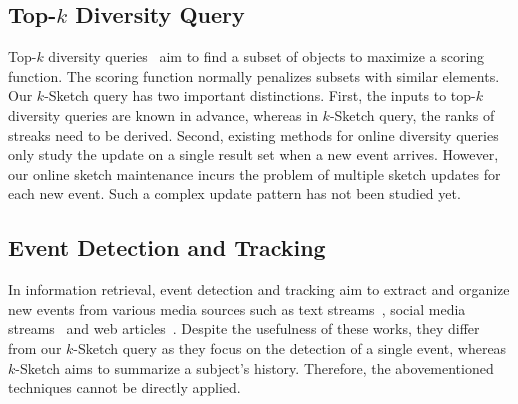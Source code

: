 \subsection{Top-$k$ Diversity Query}
Top-$k$ diversity queries~\cite{agrawal2009diversifying,borodin2012max,drosou2014diverse,chen2015diversity}
aim to find a subset of objects to maximize a scoring function. The scoring function normally penalizes
subsets with similar elements. Our 
$k$-Sketch query has two important distinctions.
First, the inputs to top-$k$ diversity queries are known in advance, whereas in $k$-Sketch query, the ranks of streaks need to be derived. 
Second, existing methods for online diversity queries~\cite{borodin2012max,drosou2014diverse,chen2015diversity} only study
the update on a single result set when a new event arrives. However, our online sketch maintenance 
incurs the problem of multiple sketch updates for each new event. Such a complex update pattern has not been studied yet.

\subsection{Event Detection and Tracking}
In information retrieval, event detection and tracking aim to extract and organize new events from various
media sources such as text streams~\cite{allan1998line,brants2003asystem}, social media streams~\cite{li2015social} and web articles~\cite{Vuurens2015Onlinenews}. 
Despite the usefulness of these works, they differ from our $k$-Sketch query as they focus on the detection of a single event, whereas $k$-Sketch aims to summarize a subject's history.
Therefore, the abovementioned techniques cannot be directly applied.

